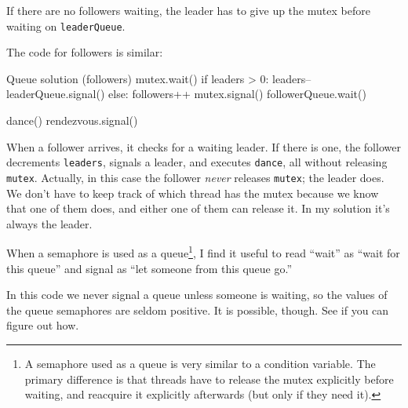 If there are no followers waiting, the leader has to give up the mutex
before waiting on {\tt leaderQueue}.

The code for followers is similar:

\begin{lstbox}{Queue solution (followers)}
mutex.wait()
if leaders > 0:
    leaders--
    leaderQueue.signal()
else:
    followers++
    mutex.signal()
    followerQueue.wait()    

dance()
rendezvous.signal()
\end{lstbox}

When a follower arrives, it checks for a waiting leader.  If there
is one, the follower decrements {\tt leaders}, signals a leader, and
executes {\tt dance}, all without releasing {\tt mutex}.  Actually,
in this case the follower {\em never} releases {\tt mutex};
the leader does.  We don't have to keep track of which thread has the
mutex because we know that one of them does, and either one of them can
release it.  In my solution it's always the leader.

When a semaphore is used as a queue\footnote{A semaphore used as a
queue is very similar to a condition variable.  The primary difference
is that threads have to release the mutex explicitly before waiting,
and reacquire it explicitly afterwards (but only if they need it).},
I find it useful to read ``wait'' as ``wait for this queue'' and
signal as ``let someone from this queue go.''

In this code we never signal a queue unless someone is waiting,
so the values of the queue semaphores are seldom positive.
It is possible, though.  See if you can figure out how.

